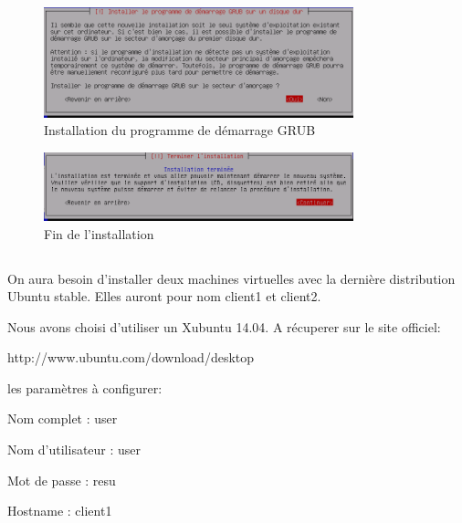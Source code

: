 \documentclass[11pt,a4paper,titlepage, oneside]{article}
\begin{document}
		\begin{figure}[htp]
                        \centering
                        \includegraphics[width=0.8\textwidth,natwidth=610,natheight=642]{images/debian21.png}
                        \caption{Installation du programme de démarrage GRUB}
 		\end{figure}

		\begin{figure}[htp]
                        \centering
                        \includegraphics[width=0.8\textwidth,natwidth=610,natheight=642]{images/debian22.png}
                        \caption{Fin de l'installation}
		\end{figure}
		
\newpage
\subsection{{\color{blue}{Installation du client ubuntu}}}
	\paragraph{}
	        On aura besoin d'installer deux machines virtuelles avec la dernière distribution Ubuntu stable. Elles auront pour nom client1 et client2.

		Nous avons choisi d'utiliser un Xubuntu 14.04. A récuperer sur le site officiel:
		
		http://www.ubuntu.com/download/desktop
		
		les paramètres à configurer:
		
		Nom complet : user
			
		Nom d'utilisateur : user
		
		Mot de passe : resu
		
		Hostname : client1
		
\end{document}

